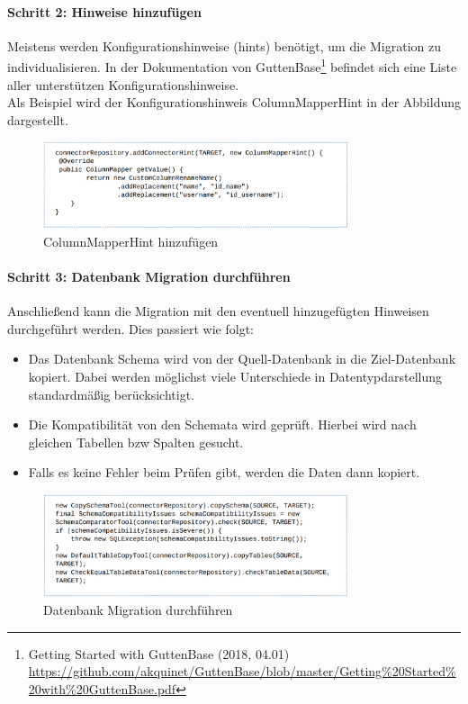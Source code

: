 	\paragraph*{Schritt 2: Hinweise hinzufügen}
	Meistens werden Konfigurationshinweise (hints) benötigt, um die Migration zu individualisieren. In der Dokumentation von GuttenBase\footnote{Getting Started with GuttenBase (2018, 04.01) \\ \url{https://github.com/akquinet/GuttenBase/blob/master/Getting\%20Started\%20with\%20GuttenBase.pdf}} befindet sich eine Liste aller unterstützen Konfigurationshinweise. \\
	Als Beispiel wird der Konfigurationshinweis ColumnMapperHint in der Abbildung dargestellt.
	\begin{figure}[H]
		\centering
		\includegraphics[width=0.8\textwidth]{images/gb/rename}
		\caption{ColumnMapperHint hinzufügen}
		\label{img:gb/rename}
	\end{figure}
	
	
	\paragraph*{Schritt 3: Datenbank Migration durchführen}
	Anschließend kann die Migration mit den eventuell hinzugefügten Hinweisen durchgeführt werden. Dies passiert wie folgt:
	\begin{itemize}
		\item Das Datenbank Schema wird von der Quell-Datenbank in die Ziel-Datenbank kopiert. Dabei werden möglichst viele Unterschiede in Datentypdarstellung standardmäßig berücksichtigt.
		\item Die Kompatibilität von den Schemata wird geprüft. Hierbei wird nach gleichen Tabellen bzw Spalten gesucht.
		\item Falls es keine Fehler beim Prüfen gibt, werden die Daten dann kopiert.
	\end{itemize}
	\begin{figure}[H]
		\centering
		\includegraphics[width=0.8\textwidth]{images/gb/copy}
		\caption{Datenbank Migration durchführen}
		\label{img:gb/copy}
	\end{figure}
	
